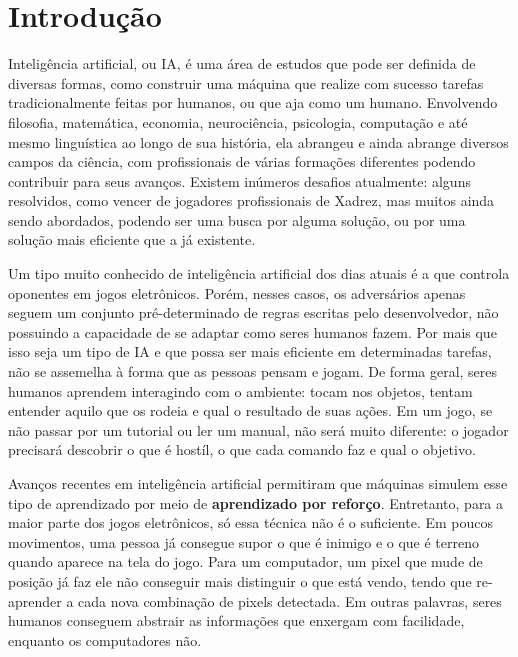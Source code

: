 
\chapter{Introdução}
\label{cap:introducao}

Inteligência artificial, ou IA, é uma área de estudos que pode ser definida de diversas formas, como construir uma máquina que realize com sucesso tarefas tradicionalmente feitas por humanos, ou que aja como um humano.
Envolvendo filosofia, matemática, economia, neurociência, psicologia, computação e até mesmo linguística ao longo de sua história, ela abrangeu e ainda abrange diversos campos da ciência, com profissionais de várias formações diferentes podendo contribuir para seus avanços.
Existem inúmeros desafios atualmente: alguns resolvidos, como vencer de jogadores profissionais de Xadrez, mas muitos ainda sendo abordados, podendo ser uma busca por alguma solução, ou por uma solução mais eficiente que a já existente.

Um tipo muito conhecido de inteligência artificial dos dias atuais é a que controla oponentes em jogos eletrônicos.
Porém, nesses casos, os adversários apenas seguem um conjunto pré-determinado de regras escritas pelo desenvolvedor, não possuindo a capacidade de se adaptar como seres humanos fazem.
Por mais que isso seja um tipo de IA e que possa ser mais eficiente em determinadas tarefas, não se assemelha à forma que as pessoas pensam e jogam.
De forma geral, seres humanos aprendem interagindo com o ambiente: tocam nos objetos, tentam entender aquilo que os rodeia e qual o resultado de suas ações.
Em um jogo, se não passar por um tutorial ou ler um manual, não será muito diferente: o jogador precisará descobrir o que é hostíl, o que cada comando faz e qual o objetivo.

Avanços recentes em inteligência artificial permitiram que máquinas simulem esse tipo de aprendizado por meio de \textbf{aprendizado por reforço}.
Entretanto, para a maior parte dos jogos eletrônicos, só essa técnica não é o suficiente.
Em poucos movimentos, uma pessoa já consegue supor o que é inimigo e o que é terreno quando aparece na tela do jogo.
Para um computador, um pixel que mude de posição já faz ele não conseguir mais distinguir o que está vendo, tendo que re-aprender a cada nova combinação de pixels detectada.
Em outras palavras, seres humanos conseguem abstrair as informações que enxergam com facilidade, enquanto os computadores não.

